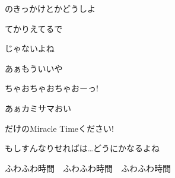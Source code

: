 のきっかけとかどうしよ

てかりえてるで

じゃないよね

あぁもういいや

ちゃおちゃおちゃおーっ!

\bigskip

あぁカミサマおい

だけのMiracle Timeください!

もしすんなりせればは…どうにかなるよね

\bigskip

ふわふわ時間　ふわふわ時間　ふわふわ時間

